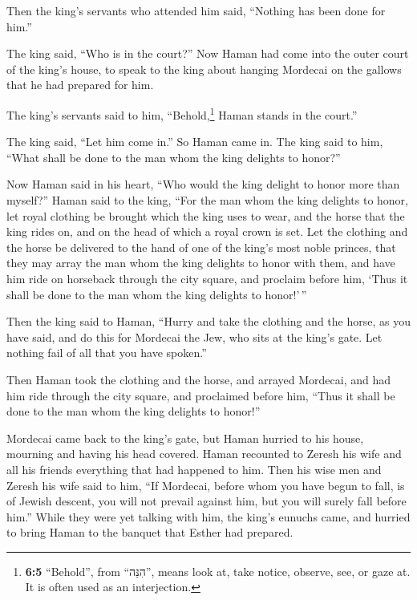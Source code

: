 Then the king's servants who attended him said, ``Nothing has been done
for him.''

 The king said, ``Who is in the court?'' Now Haman had
come into the outer court of the king's house, to speak to the king
about hanging Mordecai on the gallows that he had prepared for him.

 The king's servants said to him, ``Behold,\footnote{\textbf{6:5}
  ``Behold'', from ``הִנֵּה'', means look at, take notice, observe, see,
  or gaze at. It is often used as an interjection.} Haman stands in the
court.''

The king said, ``Let him come in.''  So Haman came in. The
king said to him, ``What shall be done to the man whom the king delights
to honor?''

Now Haman said in his heart, ``Who would the king delight to honor more
than myself?''  Haman said to the king, ``For the man whom
the king delights to honor,  let royal clothing be brought
which the king uses to wear, and the horse that the king rides on, and
on the head of which a royal crown is set.  Let the
clothing and the horse be delivered to the hand of one of the king's
most noble princes, that they may array the man whom the king delights
to honor with them, and have him ride on horseback through the city
square, and proclaim before him, `Thus it shall be done to the man whom
the king delights to honor!'\,''

 Then the king said to Haman, ``Hurry and take the
clothing and the horse, as you have said, and do this for Mordecai the
Jew, who sits at the king's gate. Let nothing fail of all that you have
spoken.''

 Then Haman took the clothing and the horse, and arrayed
Mordecai, and had him ride through the city square, and proclaimed
before him, ``Thus it shall be done to the man whom the king delights to
honor!''

 Mordecai came back to the king's gate, but Haman hurried
to his house, mourning and having his head covered. 
Haman recounted to Zeresh his wife and all his friends everything that
had happened to him. Then his wise men and Zeresh his wife said to him,
``If Mordecai, before whom you have begun to fall, is of Jewish descent,
you will not prevail against him, but you will surely fall before him.''
 While they were yet talking with him, the king's eunuchs
came, and hurried to bring Haman to the banquet that Esther had
prepared.

